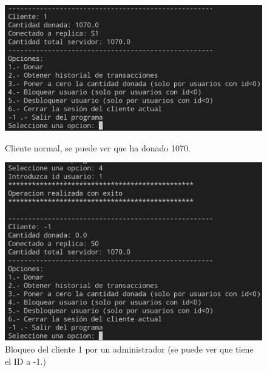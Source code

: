 \documentclass{article}
\begin{document}
\begin{figure}[H]
    \centering
    \begin{minipage}[H]{0.49\textwidth}
        \centering
        \includegraphics[width=\textwidth]{imagenes/bloqueo/1.png}
        \caption{Cliente normal, se puede ver que ha donado 1070.}
    \end{minipage}
    \hfill
    \begin{minipage}[H]{0.49\textwidth}
        \centering
        \includegraphics[width=\textwidth]{imagenes/bloqueo/2.png}
        \caption{Bloqueo del cliente 1 por un administrador (se puede ver que tiene el ID a -1.)}
    \end{minipage}
\end{figure}
\end{document}

